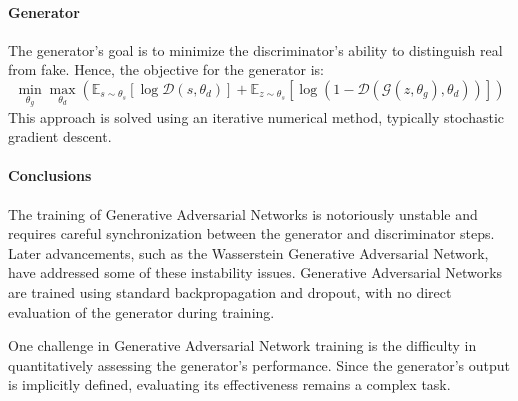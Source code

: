 \paragraph*{Generator}
The generator's goal is to minimize the discriminator's ability to distinguish real from fake. 
Hence, the objective for the generator is:
\[\min_{\theta_g}\max_{\theta_d}\left(\mathbb{E}_{s\sim \theta_s}[\log\mathcal{D}(s,\theta_d)]+\mathbb{E}_{z\sim\theta_s}[\log\left(1-\mathcal{D}(\mathcal{G}(z,\theta_g),\theta_d)\right)]\right)\]
This approach is solved using an iterative numerical method, typically stochastic gradient descent.

\paragraph*{Conclusions}
The training of Generative Adversarial Networks is notoriously unstable and requires careful synchronization between the generator and discriminator steps. 
Later advancements, such as the Wasserstein Generative Adversarial Network, have addressed some of these instability issues. 
Generative Adversarial Networks are trained using standard backpropagation and dropout, with no direct evaluation of the generator during training.

One challenge in Generative Adversarial Network training is the difficulty in quantitatively assessing the generator's performance. 
Since the generator's output is implicitly defined, evaluating its effectiveness remains a complex task.